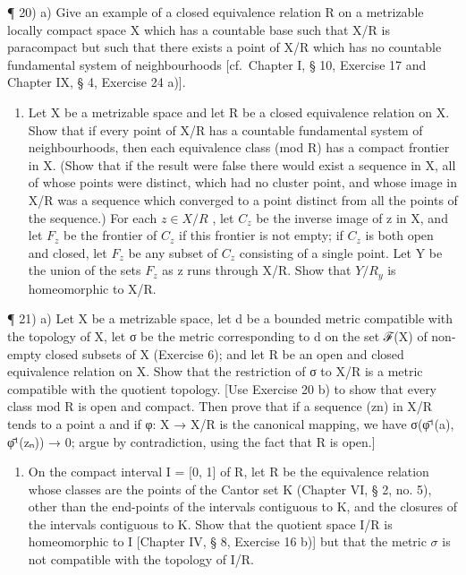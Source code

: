 ¶ 20) a) Give an example of a closed equivalence relation R on a metrizable locally compact space X which has a countable base such that X/R is paracompact but such that there exists a point of X/R which has no countable fundamental system of neighbourhoods {[}cf.~Chapter I, § 10, Exercise 17 and Chapter IX, § 4, Exercise 24 a){]}.

\begin{enumerate}
\def\labelenumi{\alph{enumi})}
\setcounter{enumi}{1}
\tightlist
\item
  Let X be a metrizable space and let R be a closed equivalence relation on X. Show that if every point of X/R has a countable fundamental system of neighbourhoods, then each equivalence class (mod R) has a compact frontier in X. (Show that if the result were false there would exist a sequence in X, all of whose points were distinct, which had no cluster point, and whose image in X/R was a sequence which converged to a point distinct from all the points of the sequence.) For each \(z \in X/R\) , let \(C_{z}\) be the inverse image of z in X, and let \(F_{z}\) be the frontier of \(C_{z}\) if this frontier is not empty; if \(C_{z}\) is both open and closed, let \(F_{z}\) be any subset of \(C_{z}\) consisting of a single point. Let Y be the union of the sets \(F_{z}\) as z runs through X/R. Show that \(Y/R_{y}\) is homeomorphic to X/R.
\end{enumerate}

¶ 21) a) Let X be a metrizable space, let d be a bounded metric compatible with the topology of X, let σ be the metric corresponding to d on the set ℱ(X) of non-empty closed subsets of X (Exercise 6); and let R be an open and closed equivalence relation on X. Show that the restriction of σ to X/R is a metric compatible with the quotient topology. {[}Use Exercise 20 b) to show that every class mod R is open and compact. Then prove that if a sequence (zn) in X/R tends to a point a and if φ: X → X/R is the canonical mapping, we have σ(φ̄¹(a), φ̄¹(zₙ)) → 0; argue by contradiction, using the fact that R is open.{]}

\begin{enumerate}
\def\labelenumi{\alph{enumi})}
\setcounter{enumi}{1}
\tightlist
\item
  On the compact interval I = {[}0, 1{]} of R, let R be the equivalence relation whose classes are the points of the Cantor set K (Chapter VI, § 2, no. 5), other than the end-points of the intervals contiguous to K, and the closures of the intervals contiguous to K. Show that the quotient space I/R is homeomorphic to I {[}Chapter IV, § 8, Exercise 16 b){]} but that the metric \(\sigma\) is not compatible with the topology of I/R.
\end{enumerate}

